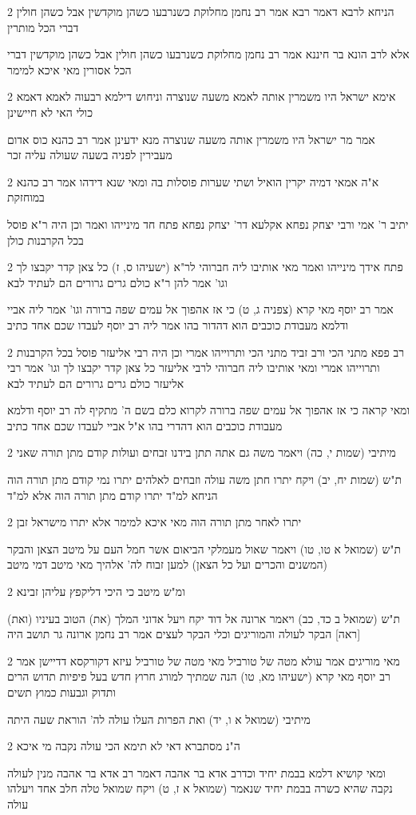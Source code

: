 \documentclass[12pt, openany]{book}
\newcommand{\sethebfont}{
\fontsize{10.5pt}{21.0pt} \selectfont
}
\newcommand{\twocol}[1]{
	{\sethebfont \begin{multicols}{2}
			#1
	\end{multicols}}	
}
\begin{document}
\twocol{הניחא לרבא דאמר רבא אמר רב נחמן מחלוקת כשנרבעו כשהן מוקדשין אבל כשהן חולין דברי הכל מותרין
\par אלא לרב הונא בר חיננא אמר רב נחמן מחלוקת כשנרבעו כשהן חולין אבל כשהן מוקדשין דברי הכל אסורין מאי איכא למימר}
\twocol{אימא ישראל היו משמרין אותה לאמא משעה שנוצרה וניחוש דילמא רבעוה לאמא דאמא כולי האי לא חיישינן
\par אמר מר ישראל היו משמרין אותה משעה שנוצרה מנא ידעינן אמר רב כהנא כוס אדום מעבירין לפניה בשעה שעולה עליה זכר}
\twocol{א"ה אמאי דמיה יקרין הואיל ושתי שערות פוסלות בה ומאי שנא דידהו אמר רב כהנא במוחזקת
\par יתיב ר' אמי ורבי יצחק נפחא אקלעא דר' יצחק נפחא פתח חד מינייהו ואמר וכן היה ר"א פוסל בכל הקרבנות כולן}
\twocol{פתח אידך מינייהו ואמר מאי אותיבו ליה חברוהי לר"א (ישעיהו ס, ז) כל צאן קדר יקבצו לך וגו' אמר להן ר"א כולם גרים גרורים הם לעתיד לבא
\par אמר רב יוסף מאי קרא (צפניה ג, ט) כי אז אהפוך אל עמים שפה ברורה וגו' אמר ליה אביי ודלמא מעבודת כוכבים הוא דהדור בהו אמר ליה רב יוסף לעבדו שכם אחד כתיב}
\twocol{רב פפא מתני הכי ורב זביד מתני הכי ותרוייהו אמרי וכן היה רבי אליעזר פוסל בכל הקרבנות ותרוייהו אמרי ומאי אותיבו ליה חברוהי לרבי אליעזר כל צאן קדר יקבצו לך וגו' אמר רבי אליעזר כולם גרים גרורים הם לעתיד לבא
\par ומאי קראה כי אז אהפוך אל עמים שפה ברורה לקרוא כלם בשם ה' מתקיף לה רב יוסף ודלמא מעבודת כוכבים הוא דהדרי בהו א"ל אביי לעבדו שכם אחד כתיב}
\twocol{מיתיבי (שמות י, כה) ויאמר משה גם אתה תתן בידנו זבחים ועולות קודם מתן תורה שאני
\par ת"ש (שמות יח, יב) ויקח יתרו חתן משה עולה וזבחים לאלהים יתרו נמי קודם מתן תורה הוה הניחא למ"ד יתרו קודם מתן תורה הוה אלא למ"ד}
\twocol{יתרו לאחר מתן תורה הוה מאי איכא למימר אלא יתרו מישראל זבן
\par ת"ש (שמואל א טו, טו) ויאמר שאול מעמלקי הביאום אשר חמל העם על מיטב הצאן והבקר (המשנים והכרים ועל כל הצאן) למען זבוח לה' אלהיך מאי מיטב דמי מיטב}
\twocol{ומ"ש מיטב כי היכי דליקפץ עליהן זבינא
\par ת"ש (שמואל ב כד, כב) ויאמר ארונה אל דוד יקח ויעל אדוני המלך (את) הטוב בעיניו (ואת) [ראה] הבקר לעולה והמוריגים וכלי הבקר לעצים אמר רב נחמן ארונה גר תושב היה}
\twocol{מאי מוריגים אמר עולא מטה של טורביל מאי מטה של טורביל עיזא דקורקסא דדיישן אמר רב יוסף מאי קרא (ישעיהו מא, טו) הנה שמתיך למורג חרוץ חדש בעל פיפיות תדוש הרים ותדוק וגבעות כמוץ תשים
\par מיתיבי (שמואל א ו, יד) ואת הפרות העלו עולה לה' הוראת שעה היתה}
\twocol{ה"נ מסתברא דאי לא תימא הכי עולה נקבה מי איכא
\par ומאי קושיא דלמא בבמת יחיד וכדרב אדא בר אהבה דאמר רב אדא בר אהבה מנין לעולה נקבה שהיא כשרה בבמת יחיד שנאמר (שמואל א ז, ט) ויקח שמואל טלה חלב אחד ויעלהו עולה}
\end{document}

